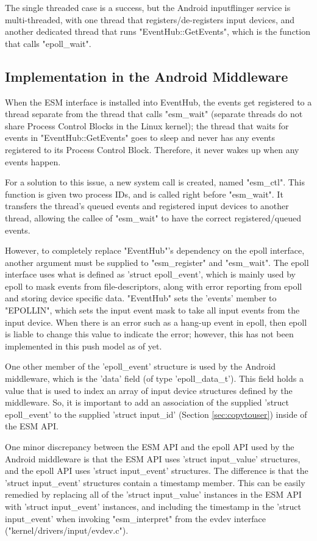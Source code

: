 \documentclass[10pt,journal,compsoc]{IEEEtran}
\begin{document}
The single threaded case is a success, but the Android inputflinger service is multi-threaded, with one thread that registers/de-registers input devices, and another dedicated thread that runs "EventHub::GetEvents", which is the function that calls "epoll\_wait".

\subsection{Implementation in the Android Middleware}
\label{sec:middleware}
When the ESM interface is installed into EventHub, the events get registered to a thread separate from the thread that calls "esm\_wait" (separate threads do not share Process Control Blocks in the Linux kernel); the thread that waits for events in "EventHub::GetEvents" goes to sleep and never has any events registered to its Process Control Block. Therefore, it never wakes up when any events happen.

For a solution to this issue, a new system call is created, named "esm\_ctl". This function is given two process IDs, and is called right before "esm\_wait". It transfers the thread's queued events and registered input devices to another thread, allowing the callee of "esm\_wait" to have the correct registered/queued events.

However, to completely replace "EventHub"'s dependency on the epoll interface, another argument must be supplied to "esm\_register" and "esm\_wait". The epoll interface uses what is defined as 'struct epoll\_event', which is mainly used by epoll to mask events from file-descriptors, along with error reporting from epoll and storing device specific data. "EventHub" sets the 'events' member to "EPOLLIN", which sets the input event mask to take all input events from the input device. When there is an error such as a hang-up event in epoll, then epoll is liable to change this value to indicate the error; however, this has not been implemented in this push model as of yet.

One other member of the 'epoll\_event' structure is used by the Android middleware, which is the 'data' field (of type 'epoll\_data\_t'). This field holds a value that is used to index an array of input device structures defined by the middleware. So, it is important to add an association of the supplied 'struct epoll\_event' to the supplied 'struct input\_id' (Section \ref{sec:copytouser}) inside of the ESM API.

One minor discrepancy between the ESM API and the epoll API used by the Android middleware is that the ESM API uses 'struct input\_value' structures, and the epoll API uses 'struct input\_event' structures. The difference is that the 'struct input\_event' structures contain a timestamp member. This can be easily remedied by replacing all of the 'struct input\_value' instances in the ESM API with 'struct input\_event' instances, and including the timestamp in the 'struct input\_event' when invoking "esm\_interpret" from the evdev interface ("kernel/drivers/input/evdev.c"). 
\end{document}
